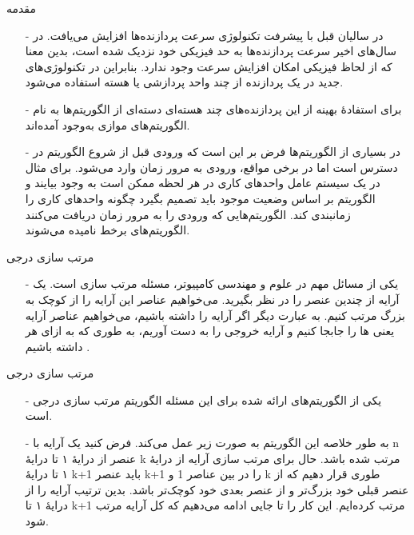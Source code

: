 \begin{frame}{مقدمه}
\begin{itemize}\itemr
\item[-]
در سالیان قبل با پیشرفت تکنولوژی سرعت پردازنده‌ها افزایش می‌یافت. در سال‌های اخیر سرعت پردازنده‌ها به حد فیزیکی خود نزدیک شده است، بدین معنا که از لحاظ فیزیکی امکان افزایش سرعت وجود ندارد. بنابراین در تکنولوژی‌های جدید در یک پردازنده از چند واحد پردازشی یا هسته استفاده می‌شود.
\item[-]
برای استفادهٔ بهینه از این پردازنده‌های چند هسته‌ای دسته‌ای از الگوریتم‌ها به نام الگوریتم‌های موازی
 به‌وجود آمده‌اند.
\item[-]
در بسیاری از الگوریتم‌ها فرض بر این است که ورودی قبل از شروع الگوریتم در دسترس است اما در برخی مواقع، ورودی به مرور زمان وارد می‌شود. برای مثال در یک سیستم عامل واحدهای کاری در هر لحظه ممکن است به وجود بیایند و الگوریتم بر اساس وضعیت موجود باید تصمیم بگیرد چگونه واحدهای کاری را زمانبندی کند. الگوریتم‌هایی که ورودی را به مرور زمان دریافت می‌کنند الگوریتم‌های برخط
نامیده می‌شوند.
\end{itemize}
\end{frame}



\begin{frame}{‌مرتب سازی درجی}
\begin{itemize}\itemr
\item[-]
یکی از مسائل مهم در علوم و مهندسی کامپیوتر، مسئله مرتب سازی است. یک آرایه از چندین عنصر را در نظر بگیرید. می‌خواهیم عناصر این آرایه را از کوچک به بزرگ مرتب کنیم. به عبارت دیگر اگر آرایه
را داشته باشیم، می‌خواهیم عناصر آرایه یعنی
ها
را جابجا کنیم و آرایه خروجی
\m{[a'_1,a'_2, ... ,a'_n]}
را به دست آوریم، به طوری
 که به ازای هر
داشته باشیم
.
\end{itemize}
\end{frame}


\begin{frame}{‌مرتب سازی درجی}
\begin{itemize}\itemr
\item[-]
یکی از الگوریتم‌های ارائه شده برای این مسئله الگوریتم مرتب سازی درجی
است.
\item[-]
به طور خلاصه این الگوریتم به صورت زیر عمل می‌کند. فرض کنید یک آرایه با n عنصر از درایهٔ ۱ تا درایهٔ k مرتب شده باشد. حال برای مرتب سازی آرایه از درایهٔ ۱ تا درایهٔ 
k+1
باید عنصر
k+1
را در بین عناصر 1 و k طوری قرار دهیم که از عنصر قبلی خود بزرگ‌تر و از عنصر بعدی خود کوچک‌تر باشد. بدین ترتیب آرایه را از درایهٔ ۱ تا k+1 مرتب کرده‌ایم. این کار را تا جایی ادامه می‌دهیم که کل آرایه مرتب شود.
\end{itemize}
\end{frame}


